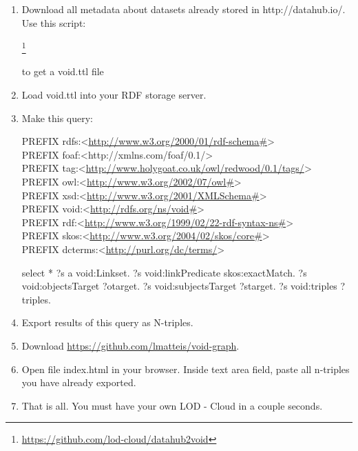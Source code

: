 \begin{enumerate}

\item Download all metadata about datasets already stored in http://datahub.io/. Use this script:

\footnote{\url{https://github.com/lod-cloud/datahub2void}}

to get a void.ttl file

\item Load void.ttl into your RDF storage server.

\item Make this query:

PREFIX rdfs:<\url{http://www.w3.org/2000/01/rdf-schema#}> \\
PREFIX foaf:<http://xmlns.com/foaf/0.1/> \\
PREFIX tag:<\url{http://www.holygoat.co.uk/owl/redwood/0.1/tags/}> \\
PREFIX owl:<\url{http://www.w3.org/2002/07/owl#}> \\
PREFIX xsd:<\url{http://www.w3.org/2001/XMLSchema#}> \\
PREFIX void:<\url{http://rdfs.org/ns/void#}> \\
PREFIX rdf:<\url{http://www.w3.org/1999/02/22-rdf-syntax-ns#}> \\
PREFIX skos:<\url{http://www.w3.org/2004/02/skos/core#}> \\
PREFIX dcterms:<\url{http://purl.org/dc/terms/}>

select * { ?s a void:Linkset. ?s void:linkPredicate skos:exactMatch. ?s void:objectsTarget ?otarget. ?s void:subjectsTarget ?starget. ?s void:triples ?triples. }

\item Export results of this query as N-triples.
\item Download \url{https://github.com/lmatteis/void-graph}. 
\item Open file index.html in your browser. Inside text area field, paste all n-triples you have already exported. 

\item That is all. You must have your own LOD - Cloud in a couple seconds. 
\end{enumerate}





% 
